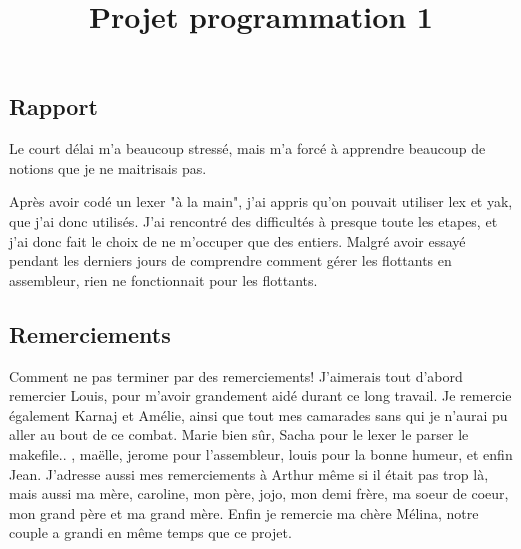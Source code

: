 \documentclass[]{article}
\title{Projet programmation 1}
\date{}
\begin{document}
\maketitle

\subsection*{Rapport}

Le court délai m'a beaucoup stressé, mais m'a forcé à apprendre beaucoup de notions que je ne maitrisais 
pas.

Après avoir codé un lexer "à la main", j'ai appris qu'on pouvait utiliser lex et yak, que j'ai donc 
utilisés. J'ai rencontré des difficultés à presque toute les etapes, et j'ai donc fait le choix 
de ne m'occuper que des entiers. Malgré avoir essayé pendant les 
derniers jours de comprendre comment gérer les flottants en assembleur, rien
ne fonctionnait pour les flottants.

\subsection*{Remerciements}

Comment ne pas terminer par des remerciements! J'aimerais tout d'abord remercier Louis, pour
m'avoir grandement aidé durant ce long travail. Je remercie également Karnaj et Amélie, ainsi
que tout mes camarades sans qui je n'aurai pu aller au bout de ce combat. Marie bien sûr, Sacha 
pour le lexer le parser le makefile.. , maëlle, jerome pour l'assembleur, louis pour la bonne humeur,
et enfin Jean. J'adresse aussi mes remerciements à Arthur même si il était pas trop là, 
mais aussi ma mère, caroline, mon père, jojo, mon demi frère, ma soeur de coeur, mon grand père et 
ma grand mère. Enfin je remercie ma chère Mélina, notre couple a grandi en même temps que ce projet. 
\end{document}
